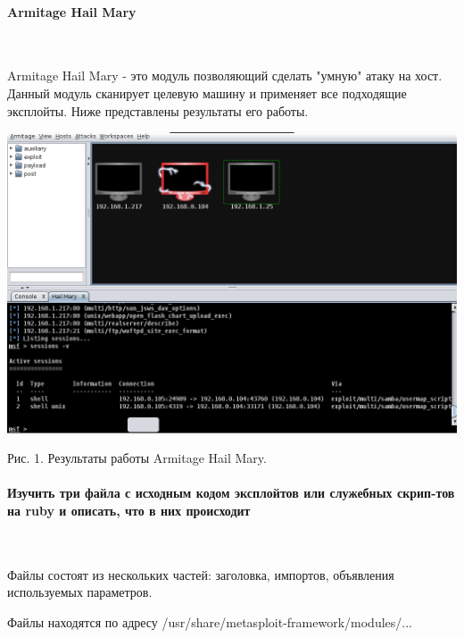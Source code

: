 \documentclass{article}
\begin{document}
\paragraph{Armitage Hail Mary}
~

Armitage Hail Mary - это модуль позволяющий сделать "умную" атаку на хост. Данный модуль сканирует целевую машину и применяет все подходящие эксплойты. Ниже представлены результаты его работы.

\includegraphics[width=\linewidth]{hailmary}
\begin{center}
Рис. 1. Результаты работы Armitage Hail Mary.
\end{center}

\paragraph{Изучить три файла с исходным кодом эксплойтов или служебных скрип-тов на ruby и описать, что в них происходит}
~

Файлы состоят из нескольких частей: заголовка, импортов, объявления используемых параметров.

Файлы находятся по адресу /usr/share/metasploit-framework/modules/...
\end{document}
